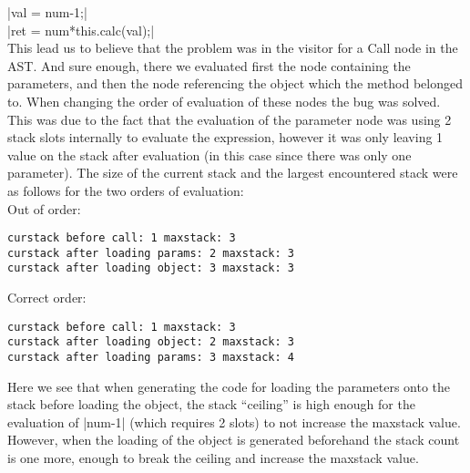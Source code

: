 \documentclass[paper=a4, fontsize=11pt]{scrartcl} %
\numberwithin{equation}{section} %
\numberwithin{figure}{section} %
\numberwithin{table}{section} %
\begin{document}
|val = num-1;|\\
|ret = num*this.calc(val);|\\

This lead us to believe that the problem was in the visitor for a Call node in the AST.
And sure enough, there we evaluated first the node containing the parameters, and then the node referencing the object which the method belonged to.
When changing the order of evaluation of these nodes the bug was solved.
This was due to the fact that the evaluation of the parameter node was using 2 stack slots internally to evaluate the expression, however it was only leaving 1 value on the stack after evaluation (in this case since there was only one parameter).
The size of the current stack and the largest encountered stack were as follows for the two orders of evaluation:\\

Out of order:
\begin{verbatim}
curstack before call: 1 maxstack: 3
curstack after loading params: 2 maxstack: 3
curstack after loading object: 3 maxstack: 3
\end{verbatim}
Correct order:
\begin{verbatim}
curstack before call: 1 maxstack: 3
curstack after loading object: 2 maxstack: 3
curstack after loading params: 3 maxstack: 4
\end{verbatim}

Here we see that when generating the code for loading the parameters onto the stack before loading the object, the stack “ceiling” is high enough for the evaluation of |num-1| (which requires 2 slots) to not increase the maxstack value.
However, when the loading of the object is generated beforehand the stack count is one more, enough to break the ceiling and increase the maxstack value.\\
\end{document}
